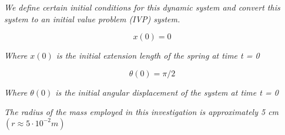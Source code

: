 \textit{We define certain initial conditions for this dynamic system and convert this system to an initial value problem (IVP) system.}
        
    $$x(0) = 0$$
        
    \textit{Where $x(0)$ is the initial extension length of the spring at time t = 0}
        
    $$\theta(0) = \pi/2$$
        
    \textit{Where $\theta(0)$ is the initial angular displacement of the system at time t = 0}
        
    \textit{The radius of the mass employed in this investigation is approximately 5 cm $(r \approx 5\cdot 10^{-2} m)$}
        
